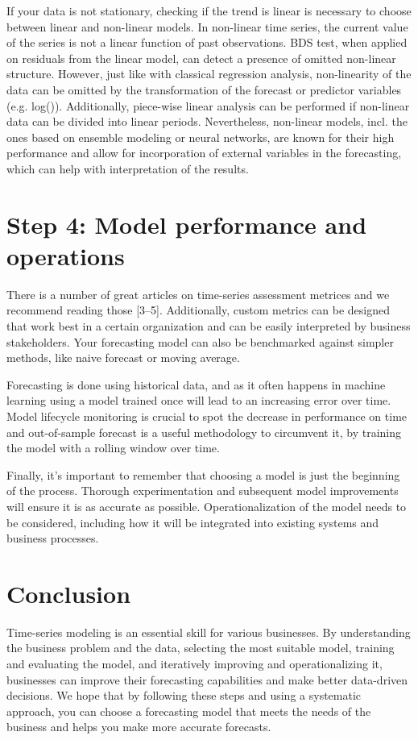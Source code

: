 If your data is not stationary, checking if the trend is linear is necessary to choose between linear and non-linear models. In non-linear time series, the current value of the series is not a linear function of past observations. BDS test, when applied on residuals from the linear model, can detect a presence of omitted non-linear structure. However, just like with classical regression analysis, non-linearity of the data can be omitted by the transformation of the forecast or predictor variables (e.g. log()). Additionally, piece-wise linear analysis can be performed if non-linear data can be divided into linear periods. Nevertheless, non-linear models, incl. the ones based on ensemble modeling or neural networks, are known for their high performance and allow for incorporation of external variables in the forecasting, which can help with interpretation of the results.

\section{Step 4: Model performance and operations}

There is a number of great articles on time-series assessment metrices and we recommend reading those [3–5]. Additionally, custom metrics can be designed that work best in a certain organization and can be easily interpreted by business stakeholders. Your forecasting model can also be benchmarked against simpler methods, like naive forecast or moving average.

Forecasting is done using historical data, and as it often happens in machine learning using a model trained once will lead to an increasing error over time. Model lifecycle monitoring is crucial to spot the decrease in performance on time and out-of-sample forecast is a useful methodology to circumvent it, by training the model with a rolling window over time.

Finally, it’s important to remember that choosing a model is just the beginning of the process. Thorough experimentation and subsequent model improvements will ensure it is as accurate as possible. Operationalization of the model needs to be considered, including how it will be integrated into existing systems and business processes.

\section{Conclusion}

Time-series modeling is an essential skill for various businesses. By understanding the business problem and the data, selecting the most suitable model, training and evaluating the model, and iteratively improving and operationalizing it, businesses can improve their forecasting capabilities and make better data-driven decisions. We hope that by following these steps and using a systematic approach, you can choose a forecasting model that meets the needs of the business and helps you make more accurate forecasts.

